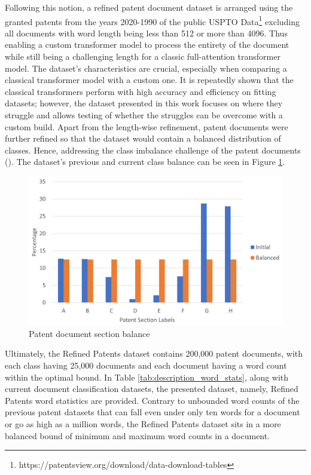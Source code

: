 \documentclass{iyte}
\begin{document}
Following this notion, a refined patent document dataset is arranged using the granted patents from the years 2020-1990 of the public USPTO Data\footnote{https://patentsview.org/download/data-download-tables} excluding all documents with word length being less than 512 or more than 4096. Thus enabling a custom transformer model to process the entirety of the document while still being a challenging length for a classic full-attention transformer model. The dataset's characteristics are crucial, especially when comparing a classical transformer model with a custom one. It is repeatedly shown that the classical transformers perform with high accuracy and efficiency on fitting datasets; however, the dataset presented in this work focuses on where they struggle and allows testing of whether the struggles can be overcome with a custom build. Apart from the length-wise refinement, patent documents were further refined so that the dataset would contain a balanced distribution of classes. Hence, addressing the class imbalance challenge of the patent documents (\citealt{patent_classification_book_survey}). The dataset's previous and current class balance can be seen in Figure \ref{chart:section_dist}.


\begin{figure}[ht]
\includegraphics[width=14.5cm]{images/section_dist.png}
\caption{Patent document section balance}
\label{chart:section_dist}
\end{figure}

Ultimately, the Refined Patents dataset contains 200,000 patent documents, with each class having 25,000 documents and each document having a word count within the optimal bound. In Table \ref{tab:description_word_stats}, along with current document classification datasets, the presented dataset, namely, Refined Patents word statistics are provided. Contrary to unbounded word counts of the previous patent datasets that can fall even under only ten words for a document or go as high as a million words, the Refined Patents dataset sits in a more balanced bound of minimum and maximum word counts in a document.
\end{document}
